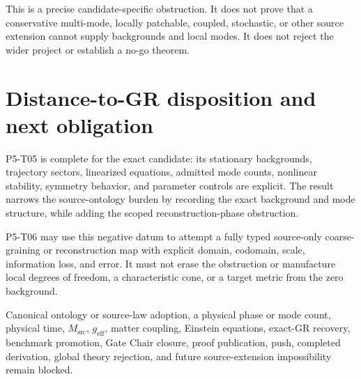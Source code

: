 \documentclass[11pt]{article}
\begin{document}
This is a precise candidate-specific obstruction.  It does not prove that a
conservative multi-mode, locally patchable, coupled, stochastic, or other
source extension cannot supply backgrounds and local modes.  It does not
reject the wider project or establish a no-go theorem.

\section{Distance-to-GR disposition and next obligation}

P5-T05 is complete for the exact candidate: its stationary backgrounds,
trajectory sectors, linearized equations, admitted mode counts, nonlinear
stability, symmetry behavior, and parameter controls are explicit.  The
result narrows the source-ontology burden by recording the exact background
and mode structure, while adding the scoped reconstruction-phase obstruction.

P5-T06 may use this negative datum to attempt a fully typed source-only
coarse-graining or reconstruction map with explicit domain, codomain, scale,
information loss, and error.  It must not erase the obstruction or manufacture
local degrees of freedom, a characteristic cone, or a target metric from the
zero background.

Canonical ontology or source-law adoption, a physical phase or mode count,
physical time, \(M_{\mathrm{src}}\), \(g_{\mathrm{eff}}\), matter coupling,
Einstein equations, exact-GR recovery, benchmark promotion, Gate Chair
closure, proof publication, push, completed derivation, global theory
rejection, and future source-extension impossibility remain blocked.
\end{document}
